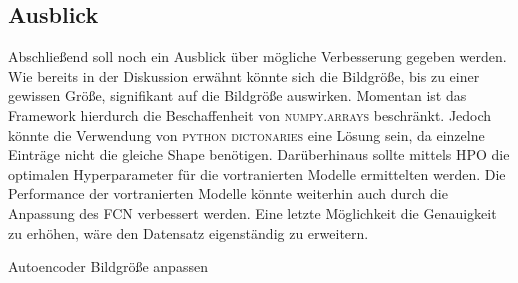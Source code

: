 \subsection{Ausblick}
Abschließend soll noch ein Ausblick über mögliche Verbesserung gegeben werden.
Wie bereits in der Diskussion erwähnt könnte sich die Bildgröße, bis zu einer
gewissen Größe, signifikant auf die Bildgröße auswirken. Momentan ist das
Framework hierdurch die Beschaffenheit von \textsc{numpy.arrays} beschränkt.
Jedoch könnte die Verwendung von \textsc{python} \textsc{dictonaries} eine Lösung sein,
da einzelne Einträge nicht die gleiche Shape benötigen. Darüberhinaus sollte mittels
HPO die optimalen Hyperparameter für die vortranierten Modelle ermittelten werden.
Die Performance der vortranierten Modelle könnte weiterhin auch durch die Anpassung
des FCN verbessert werden. Eine letzte Möglichkeit die Genauigkeit zu erhöhen,
wäre den Datensatz eigenständig zu erweitern.

Autoencoder Bildgröße anpassen
\newpage
